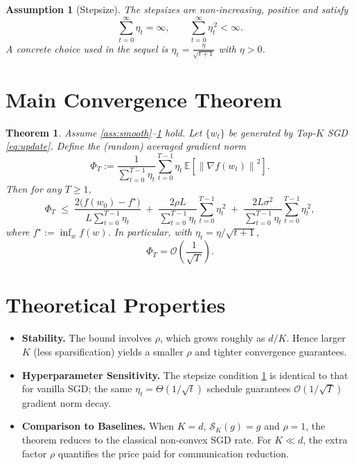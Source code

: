 \documentclass{article}
\newcommand{\EE}{\mathbb{E}}
\newcommand{\norm}[1]{\left\|#1\right\|}
\newcommand{\topk}[1]{\mathcal{S}_K(#1)}
\newtheorem{theorem}{Theorem}
\newtheorem{assumption}{Assumption}
\begin{document}
\begin{assumption}[Stepsize]\label{ass:stepsize}
The stepsizes are non‑increasing, positive and satisfy
\[
\sum_{t=0}^{\infty}\eta_t = \infty,\qquad
\sum_{t=0}^{\infty}\eta_t^{\,2}<\infty .
\]
A concrete choice used in the sequel is $\displaystyle\eta_t=\frac{\eta}{\sqrt{t+1}}$
with $\eta>0$.
\end{assumption}

\section*{Main Convergence Theorem}

\begin{theorem}\label{thm:convergence}
Assume \ref{ass:smooth}–\ref{ass:stepsize} hold.
Let $\{w_t\}$ be generated by Top‑$K$ SGD \eqref{eq:update}.
Define the (random) averaged gradient norm
\[
\Phi_T := \frac{1}{\sum_{t=0}^{T-1}\eta_t}\sum_{t=0}^{T-1}\eta_t\,
\EE\!\left[\norm{\nabla f(w_t)}^2\right].
\]
Then for any $T\ge1$,
\[
\Phi_T \;\le\;
\frac{2\bigl(f(w_0)-f^\star\bigr)}{L\sum_{t=0}^{T-1}\eta_t}
\;+\;
\frac{2\rho L}{\sum_{t=0}^{T-1}\eta_t}
\sum_{t=0}^{T-1}\eta_t^{\,2}
\;+\;
\frac{2L\sigma^2}{\sum_{t=0}^{T-1}\eta_t}
\sum_{t=0}^{T-1}\eta_t^{\,2},
\]
where $f^\star:=\inf_{w}f(w)$. 
In particular, with $\eta_t=\eta/\sqrt{t+1}$,
\[
\Phi_T = \mathcal{O}\!\left(\frac{1}{\sqrt{T}}\right).
\]
\end{theorem}

\section*{Theoretical Properties}

\begin{itemize}[leftmargin=*]
\item \textbf{Stability.} The bound involves $\rho$, which grows roughly as $d/K$.
Hence larger $K$ (less sparsification) yields a smaller $\rho$ and
tighter convergence guarantees.
\item \textbf{Hyperparameter Sensitivity.}
The stepsize condition \ref{ass:stepsize} is identical to that for vanilla SGD;
the same $\eta_t=\Theta(1/\sqrt{t})$ schedule guarantees $\mathcal{O}(1/\sqrt{T})$
gradient norm decay.
\item \textbf{Comparison to Baselines.}
When $K=d$, $\topk{g}=g$ and $\rho=1$, the theorem reduces to the classical
non‑convex SGD rate. For $K\ll d$, the extra factor $\rho$ quantifies the price
paid for communication reduction.
\end{itemize}
\end{document}
